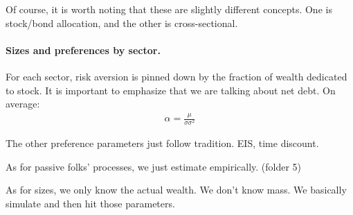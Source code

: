 \documentclass[pdftex,12pt,a4paper]{article}
\begin{document}
Of course, it is worth noting that these are slightly different concepts. One is stock/bond allocation, and the other is cross-sectional. 


\paragraph{Sizes and preferences by sector.}
For each sector, risk aversion is pinned down by the fraction of wealth dedicated to stock. It is important to emphasize that we are talking about net debt. On average:
\begin{align*}
\alpha = \frac{\mu}{\sigma \sigma^2}
\end{align*}

The other preference parameters just follow tradition. EIS, time discount. 

As for passive folks' processes, we just estimate empirically. (folder 5)

As for sizes, we only know the actual wealth. We don't know mass. We basically simulate and then hit those parameters.



\end{document}
